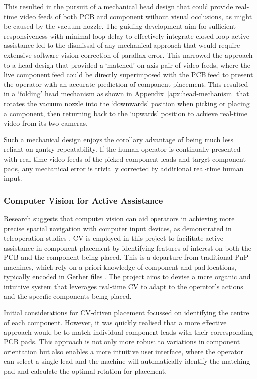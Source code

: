 \documentclass[12pt,british,UKenglish]{article}
\begin{document}
This resulted in the pursuit of a mechanical head design that could provide real-time video feeds of both \ac{PCB} and component without visual occlusions, as might be caused by the vacuum nozzle.
The guiding development aim for sufficient responsiveness with minimal loop delay to effectively integrate closed-loop active assistance led to the dismissal of any mechanical approach that would require extensive software vision correction of parallax error.
This narrowed the approach to a head design that provided a `matched' on-axis pair of video feeds, where the live component feed could be directly superimposed with the \ac{PCB} feed to present the operator with an accurate prediction of component placement.
This resulted in a `folding' head mechanism as shown in Appendix~\ref{apx:head-mechanism} that rotates the vacuum nozzle into the `downwards' position when picking or placing a component, then returning back to the `upwards' position to achieve real-time video from its two cameras.

Such a mechanical design enjoys the corollary advantage of being much less reliant on gantry repeatability.
If the human operator is continually presented with real-time video feeds of the picked component leads and target component pads, any mechanical error is trivially corrected by additional real-time human input.


\subsubsection{Computer Vision for Active Assistance}


Research suggests that computer vision can aid operators in achieving more precise spatial navigation with computer input devices, as demonstrated in teleoperation studies \cite{AMAT2002473}.
\Acl{CV} is employed in this project to facilitate active assistance in component placement by identifying features of interest on both the \ac{PCB} and the component being placed.
This is a departure from traditional \ac{PnP} machines, which rely on a priori knowledge of component and pad locations, typically encoded in Gerber files \cite{15543404}.
The project aims to devise a more organic and intuitive system that leverages real-time \ac{CV} to adapt to the operator's actions and the specific components being placed.

Initial considerations for \ac{CV}-driven placement focussed on identifying the centre of each component.
However, it was quickly realised that a more effective approach would be to match individual component leads with their corresponding \ac{PCB} pads.
This approach is not only more robust to variations in component orientation but also enables a more intuitive user interface, where the operator can select a single lead and the machine will automatically identify the matching pad and calculate the optimal rotation for placement.
\end{document}
